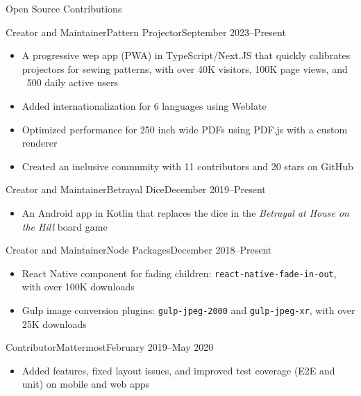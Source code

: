 \documentclass[]{mcdowellcv}
\begin{document}
	\makeheader
	
	\begin{cvsection}{Open Source Contributions}
    \begin{cvsubsection}{Creator and Maintainer}{Pattern Projector}{September 2023--Present}
      \begin{itemize}
        \item A progressive wep app (PWA) in TypeScript/Next.JS that quickly calibrates projectors for sewing patterns, with over 40K visitors, 100K page views, and ~500 daily active users
        \item Added internationalization for 6 languages using Weblate
        \item Optimized performance for 250 inch wide PDFs using PDF.js with a custom renderer
        \item Created an inclusive community with 11 contributors and 20 stars on GitHub
      \end{itemize}
    \end{cvsubsection}
  
    \begin{cvsubsection}{Creator and Maintainer}{Betrayal Dice}{December 2019--Present}
      \begin{itemize}
        \item An Android app in Kotlin that replaces the dice in the \textit{Betrayal at House on the Hill} board game
      \end{itemize}
    \end{cvsubsection}
    
    \begin{cvsubsection}{Creator and Maintainer}{Node Packages}{December 2018--Present}
      \begin{itemize}
        \item React Native component for fading children: \texttt{react-native-fade-in-out}, with over 100K downloads
        \item Gulp image conversion plugins: \texttt{gulp-jpeg-2000} and \texttt{gulp-jpeg-xr}, with over 25K downloads
      \end{itemize}
    \end{cvsubsection}	
  
    \begin{cvsubsection}{Contributor}{Mattermost}{February 2019--May 2020}
      \begin{itemize}
        \item Added features, fixed layout issues, and improved test coverage (E2E and unit) on mobile and web apps
      \end{itemize}
    \end{cvsubsection}
  \end{cvsection}
\end{document}
